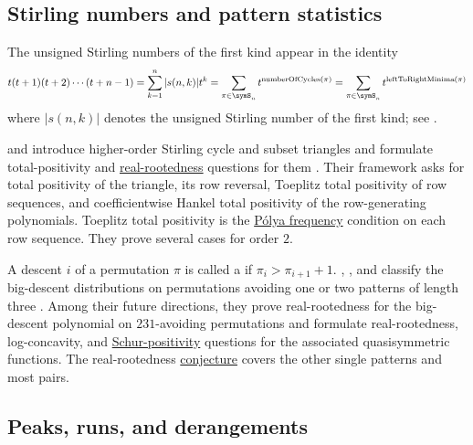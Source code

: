 \subsection[sturmPermutations]{Stirling numbers and pattern statistics}


\begin{example*}

The unsigned Stirling numbers of the first kind appear in the identity
\[
t(t+1)(t+2)\dotsm (t+n-1) = \sum_{k=1}^n |s(n,k)|t^k
= \sum_{\pi \in \symS_n} t^{\mathrm{numberOfCycles}(\pi)} = \sum_{\pi \in \symS_n} t^{\mathrm{leftToRightMinima}(\pi)}
\]
where $|s(n,k)|$ denotes the unsigned Stirling number of the first kind;
see .
\end{example*}

\begin{example*}
 and  introduce higher-order Stirling
cycle and subset triangles and formulate total-positivity and
\hyperref[realRootedPolynomial]{real-rootedness} questions for them
\cite{DebSokal2025x}.  Their framework asks for total
positivity of the triangle, its row reversal, Toeplitz total positivity of row
sequences, and coefficientwise Hankel total positivity of the row-generating
polynomials.  Toeplitz total positivity is the
\hyperref[polyaFrequency]{Pólya frequency} condition on each row sequence.
They prove several cases for order \(2\).
\end{example*}

\begin{example*}
A descent $i$ of a permutation $\pi$ is called a
\label{bigDescent} if
$\pi_i>\pi_{i+1}+1$.  , , and
 classify the big-descent distributions on permutations
avoiding one or two patterns of length three \cite{ElizaldeRiveraZhuang2026}.
Among their future directions, they prove real-rootedness for the
big-descent polynomial on $231$-avoiding permutations and formulate
real-rootedness, log-concavity, and
\hyperref[schurPositivity]{Schur-positivity} questions for the
associated quasisymmetric functions.  The real-rootedness
\hyperref[conjBigDescents]{conjecture} covers the other single patterns and
most pairs.
\end{example*}


\subsection[peakRunDerangementPolynomials]{Peaks, runs, and derangements}

